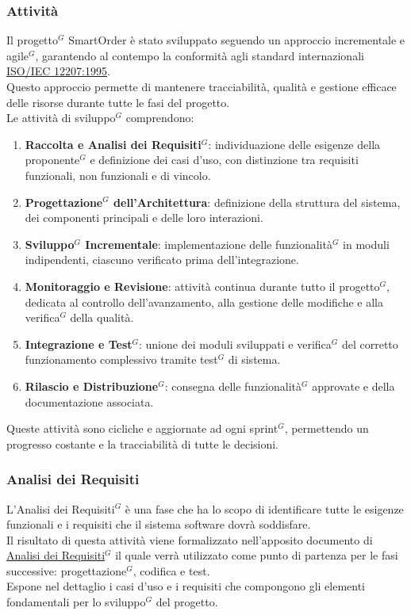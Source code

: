 	\subsubsection{Attività}
	Il progetto$^G$ SmartOrder è stato sviluppato seguendo un approccio incrementale e agile$^G$, garantendo al contempo la conformità agli standard internazionali 
	\href{https://www.math.unipd.it/~tullio/IS-1/2009/Approfondimenti/ISO_12207-1995.pdf}{ISO/IEC 12207:1995}.\\ 
	Questo approccio permette di mantenere tracciabilità, qualità e gestione efficace delle risorse durante tutte le fasi del progetto.\\
	Le attività di sviluppo$^G$ comprendono:
	\begin{enumerate}[itemsep=3pt, parsep=1pt, label=$\scriptstyle\bullet$]
		\item \textbf{Raccolta e Analisi dei Requisiti$^G$}: individuazione delle esigenze della proponente$^G$ e definizione dei casi d’uso, con distinzione tra requisiti funzionali, non funzionali e di vincolo.
		\item \textbf{Progettazione$^G$ dell’Architettura}: definizione della struttura del sistema, dei componenti principali e delle loro interazioni.
		\item \textbf{Sviluppo$^G$ Incrementale}: implementazione delle funzionalità$^G$ in moduli indipendenti, ciascuno verificato prima dell’integrazione.
		\item \textbf{Monitoraggio e Revisione}: attività continua durante tutto il progetto$^G$, dedicata al controllo dell’avanzamento, alla gestione delle modifiche e alla verifica$^G$ della qualità.
		\item \textbf{Integrazione e Test$^G$}: unione dei moduli sviluppati e verifica$^G$ del corretto funzionamento complessivo tramite test$^G$ di sistema.
		\item \textbf{Rilascio e Distribuzione$^G$}: consegna delle funzionalità$^G$ approvate e della documentazione associata.
	\end{enumerate}
	Queste attività sono cicliche e aggiornate ad ogni sprint$^G$, permettendo un progresso costante e la tracciabilità di tutte le decisioni.

	\subsubsection{Analisi dei Requisiti}
	L'Analisi dei Requisiti$^G$ è una fase che ha lo scopo di identificare tutte le esigenze funzionali e i requisiti che il sistema software dovrà soddisfare.\\
	Il risultato di questa attività viene formalizzato nell’apposito documento di \href{https://nullpointersgroup.github.io/Documentazione/output/PB/Documenti%20Esterni/Analisi_dei_Requisiti.pdf}{Analisi dei Requisiti$^G$} il quale verrà utilizzato come punto di partenza per le fasi successive: progettazione$^G$, codifica e test.\\
	Espone nel dettaglio i casi d’uso e i requisiti che compongono gli elementi fondamentali per lo sviluppo$^G$ del progetto.

